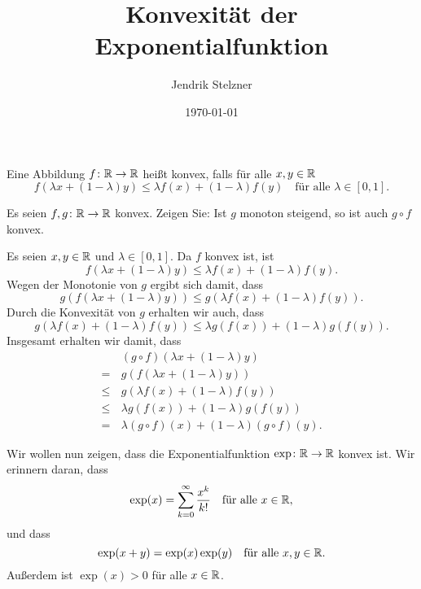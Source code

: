 \documentclass[a4paper,10pt]{article}
\title{Konvexität der Exponentialfunktion}
\author{Jendrik Stelzner}
\date{\today}
\begin{document}
\maketitle


\begin{defi}
 Eine Abbildung $f \colon \mathbb{R} \to \mathbb{R}$ heißt konvex, falls für alle $x,y \in \mathbb{R}$
 \[
  f(\lambda x + (1-\lambda)y) \leq \lambda f(x) + (1-\lambda) f(y)
  \quad \text{für alle $\lambda \in [0,1]$}.
 \]
\end{defi}


\begin{question}
 Es seien $f, g \colon \mathbb{R} \to \mathbb{R}$ konvex. Zeigen Sie: Ist $g$ monoton steigend, so ist auch $g \circ f$ konvex.
\end{question}
\begin{solution}
 Es seien $x,y \in \mathbb{R}$ und $\lambda \in [0,1]$. Da $f$ konvex ist, ist
 \[
  f(\lambda x + (1-\lambda)y) \leq \lambda f(x) + (1-\lambda) f(y).
 \]
 Wegen der Monotonie von $g$ ergibt sich damit, dass
 \[
  g(f(\lambda x + (1-\lambda)y)) \leq g(\lambda f(x) + (1-\lambda) f(y)).
 \]
 Durch die Konvexität von $g$ erhalten wir auch, dass
 \[
  g(\lambda f(x) + (1-\lambda) f(y))
  \leq \lambda g(f(x)) + (1-\lambda) g(f(y)).
 \]
 Insgesamt erhalten wir damit, dass
 \begin{align*}
      &\, (g \circ f)(\lambda x + (1-\lambda) y) \\
     =&\, g(f(\lambda x + (1-\lambda) y)) \\
  \leq&\, g(\lambda f(x) + (1-\lambda) f(y)) \\
  \leq&\, \lambda g(f(x)) + (1-\lambda) g(f(y)) \\
     =&\, \lambda (g \circ f)(x) + (1-\lambda) (g \circ f)(y).
 \end{align*}
\end{solution}


Wir wollen nun zeigen, dass die Exponentialfunktion $\exp \colon \mathbb{R} \to \mathbb{R}$ konvex ist. Wir erinnern daran, dass
\[
 \exp(x) = \sum_{k=0}^\infty \frac{x^k}{k!} \quad \text{für alle $x \in \mathbb{R}$},
\]
und dass
\begin{equation}\label{eqn: exp Gruppenhomo}
 \exp(x+y) = \exp(x) \exp(y) \quad \text{für alle $x,y \in \mathbb{R}$}.
\end{equation}
Außerdem ist $\exp(x) > 0$ für alle $x \in \mathbb{R}$.
\end{document}
